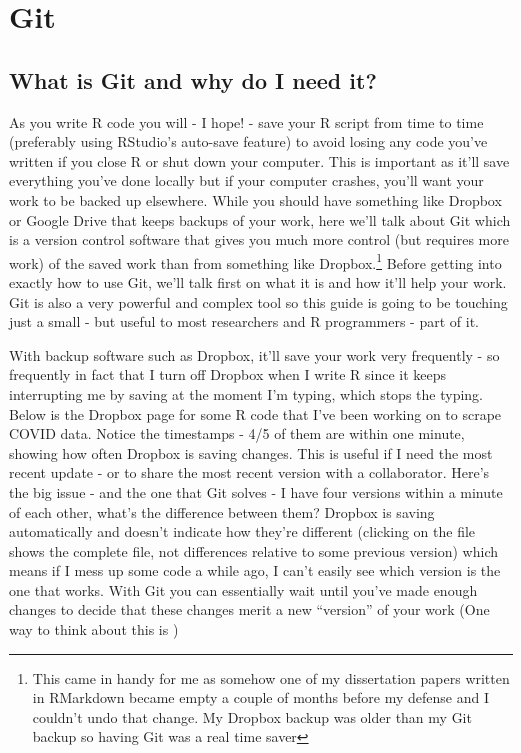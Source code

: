 \documentclass[
  12pt,
  openany]{book}
\begin{document}
\hypertarget{git}{%
\chapter{Git}\label{git}}

\hypertarget{what-is-git-and-why-do-i-need-it}{%
\section{What is Git and why do I need it?}\label{what-is-git-and-why-do-i-need-it}}

As you write R code you will - I hope! - save your R script from time to time (preferably using RStudio's auto-save feature) to avoid losing any code you've written if you close R or shut down your computer. This is important as it'll save everything you've done locally but if your computer crashes, you'll want your work to be backed up elsewhere. While you should have something like Dropbox or Google Drive that keeps backups of your work, here we'll talk about Git which is a version control software that gives you much more control (but requires more work) of the saved work than from something like Dropbox.\footnote{This came in handy for me as somehow one of my dissertation papers written in RMarkdown became empty a couple of months before my defense and I couldn't undo that change. My Dropbox backup was older than my Git backup so having Git was a real time saver} Before getting into exactly how to use Git, we'll talk first on what it is and how it'll help your work. Git is also a very powerful and complex tool so this guide is going to be touching just a small - but useful to most researchers and R programmers - part of it.

With backup software such as Dropbox, it'll save your work very frequently - so frequently in fact that I turn off Dropbox when I write R since it keeps interrupting me by saving at the moment I'm typing, which stops the typing. Below is the Dropbox page for some R code that I've been working on to scrape COVID data. Notice the timestamps - 4/5 of them are within one minute, showing how often Dropbox is saving changes. This is useful if I need the most recent update - or to share the most recent version with a collaborator. Here's the big issue - and the one that Git solves - I have four versions within a minute of each other, what's the difference between them? Dropbox is saving automatically and doesn't indicate how they're different (clicking on the file shows the complete file, not differences relative to some previous version) which means if I mess up some code a while ago, I can't easily see which version is the one that works. With Git you can essentially wait until you've made enough changes to decide that these changes merit a new ``version'' of your work (One way to think about this is )
\end{document}
